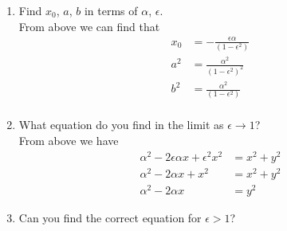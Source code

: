 \documentclass{article}
\begin{document}
\begin{enumerate}
\begin{enumerate}
            \item Find $x_0$, $a$, $b$ in terms of $\alpha$, $\epsilon$.\\

            From above we can find that
            \begin{align*}
                x_0 &= -\frac{\epsilon \alpha}{(1-\epsilon^2)} \\
                a^2 &= \frac{\alpha^2}{(1-\epsilon^2)^2} \\
                b^2 &= \frac{\alpha^2}{(1-\epsilon^2)} \\
            \end{align*}
            \item What equation do you find in the limit as $\epsilon \rightarrow 1$?\\

            From above we have
            \begin{align*}
                \alpha^2 - 2\epsilon\alpha x + \epsilon^2 x^2 &= x^2 +y^2 \\
                \alpha^2 - 2\alpha x + x^2 &= x^2 +y^2 \\
                \alpha^2 - 2\alpha x &= y^2
            \end{align*}

            \item Can you find the correct equation for $\epsilon > 1$?\\


\end{enumerate}
\end{enumerate}
\end{document}
